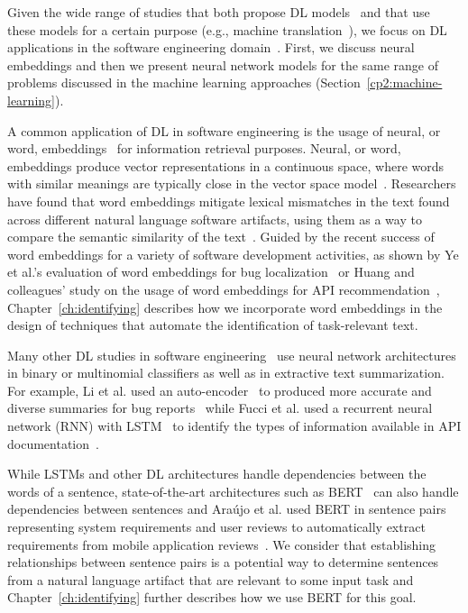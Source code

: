 Given the wide range of studies that both propose \acs{DL} models~\cite{} and that use 
these models for a certain purpose (e.g., machine translation~\cite{lopez2008translation}), 
we focus
on \acs{DL} applications in the 
software engineering domain~\cite{ferreira2021, li2018deep, watson2022}.
First, we discuss neural embeddings and then we present 
neural network models 
for the same range of problems discussed in the machine learning approaches (Section~\ref{cp2:machine-learning}).






A common application of \acs{DL} in software engineering is the usage of neural, or word, embeddings~\cite{Mikolov2013}
for information retrieval purposes. 
Neural, or word, embeddings produce vector representations in a continuous space,
where words with similar meanings are typically close in the vector space model~\cite{harris1954distributional, mikolov2013efficient}. 
Researchers have found that word
embeddings mitigate lexical mismatches in the text found across different 
natural language software artifacts,
using them as a way to compare the semantic similarity of the text~\cite{mihalcea2006}.
Guided by the recent success of word embeddings 
for a variety of software development 
activities, as shown by Ye et al.'s evaluation of word embeddings
for bug localization~\cite{Ye2016}
or Huang and colleagues' study on 
the usage of word embeddings for API recommendation~\cite{Huang2018},
Chapter~\ref{ch:identifying} 
describes how we incorporate word embeddings in the 
design of techniques that automate the identification of task-relevant text. 






Many other \acs{DL} studies in software engineering~\cite{ferreira2021,li2018deep, watson2022}
use neural network architectures 
in binary or multinomial classifiers as well as in extractive text summarization.
For example, Li et al. used an auto-encoder~\cite{liou2014autoencoder}
to produced more accurate and diverse summaries 
for bug reports~\cite{li2018deep} while 
Fucci et al. used a 
recurrent neural network (\acs{RNN}) with 
\acf{LSTM}~\cite{hochreiter1997lstm}
to identify the types of information available in 
API documentation~\cite{fucci2019}.


While \acs{LSTM}s and other \acs{DL} architectures 
handle dependencies between the words of a sentence, 
state-of-the-art architectures such as \acf{BERT}~\cite{Devlin2018Bert}
can also handle dependencies between sentences
and Ara{\'u}jo et al. used \acs{BERT} in sentence pairs 
representing system requirements and user reviews 
to automatically extract requirements from 
mobile application reviews~\cite{Araujo2021}.
We consider that 
establishing relationships 
between sentence pairs is 
a potential way to determine 
sentences from a natural language artifact 
that are relevant to some input task 
and Chapter~\ref{ch:identifying}
further describes how 
we use \acs{BERT} for this goal.

